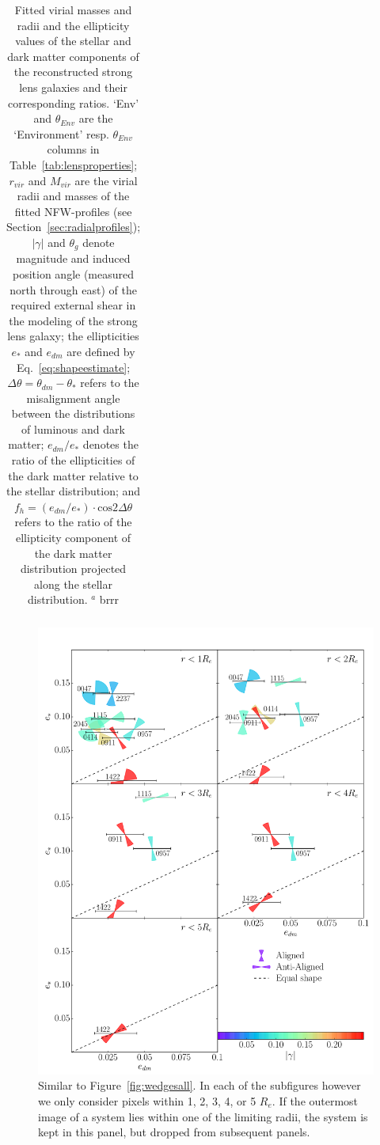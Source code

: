 \documentclass[useAMS,usenatbib]{mn2e}
\begin{document}
\begin{table}
\begin{center}
\begin{tabular}{l l l l l l l l l l l l}
    \end{tabular}
    \caption{Fitted virial masses and radii and the ellipticity values of the stellar and dark matter components of the reconstructed strong lens galaxies and their corresponding ratios. `Env' and $\theta_{Env}$ are the `Environment' resp. $\theta_{Env}$ columns in Table~\ref{tab:lensproperties}; $r_{vir}$ and $M_{vir}$ are the virial radii and masses of the fitted NFW-profiles (see Section~\ref{sec:radialprofiles}); $|\gamma|$ and $\theta_{g}$ denote magnitude and induced position angle (measured north through east) of the required external shear in the modeling of the strong lens galaxy; the ellipticities $e_{*}$ and $e_{dm}$ are defined by Eq.~\ref{eq:shapeestimate}; $\Delta\theta=\theta_{dm}-\theta_{*}$ refers to the misalignment angle between the distributions of luminous and dark matter; $e_{dm}/e_{*}$ denotes the ratio of the ellipticities of the dark matter relative to the stellar distribution; and $f_h=(e_{dm}/e_{*})\cdot\mathrm{cos} 2\Delta\theta$ refers to the ratio of the ellipticity component of the dark matter distribution projected along the stellar distribution. \newline $^{a}$ brrr}
    \label{tab:ellipratios}
  \end{center}
\end{table}

\begin{figure}
  \centering
  \includegraphics[width=.75\linewidth]{Figures/wedges.pdf}
  \caption[width=\linewidth]{Similar to Figure~\ref{fig:wedgesall}. In each of the subfigures however we only consider pixels within 1, 2, 3, 4, or 5 $R_e$. If the outermost image of a system lies within one of the limiting radii, the system is kept in this panel, but dropped from subsequent panels.}
  \label{fig:wedgesradii}
\end{figure}
\end{document}
